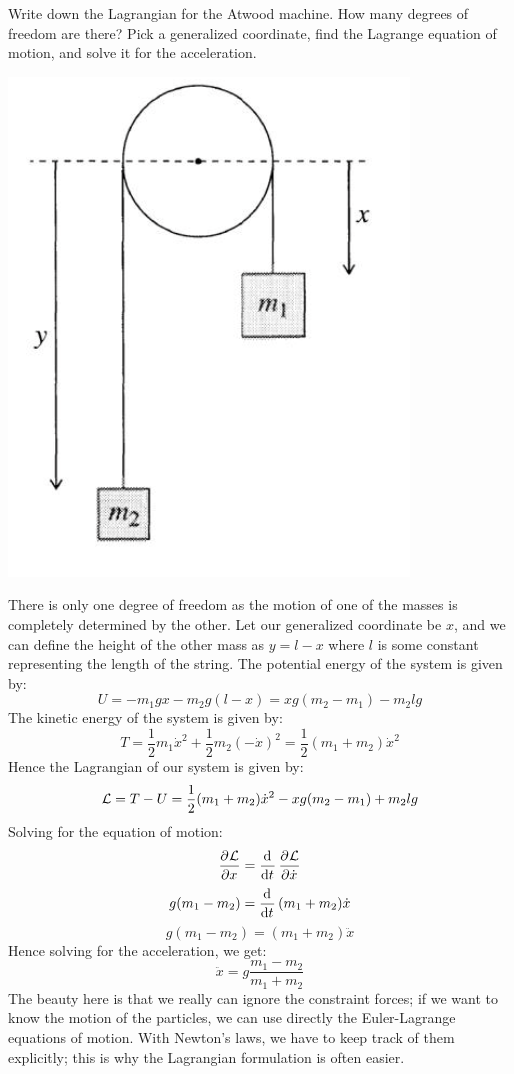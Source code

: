 \documentclass[../PHYS306Notes.tex]{subfiles}
\begin{document}
\begin{p}
Write down the Lagrangian for the Atwood machine. How many degrees of freedom are there? Pick a generalized coordinate, find the Lagrange equation of motion, and solve it for the acceleration.
\begin{center}
    \includegraphics[scale=0.6]{Lecture-4/W4-img1.png}
\end{center}
\end{p}
\begin{s}
There is only one degree of freedom as the motion of one of the masses is completely determined by the other. Let our generalized coordinate be $x$, and we can define the height of the other mass as $y = l - x$ where $l$ is some constant representing the length of the string. The potential energy of the system is given by:
\[U = -m_1gx - m_2g(l-x) = xg(m_2-m_1) - m_2lg\]
The kinetic energy of the system is given by:
\[T = \frac{1}{2}m_1\dot{x}^2 + \frac{1}{2}m_2(-\dot{x})^2 = \frac{1}{2}(m_1 + m_2)\dot{x}^2\]
Hence the Lagrangian of our system is given by:
\[\mathcal{L} = T - U = \frac{1}{2}(m_1 + m_2)\dot{x}^2 - xg(m_2-m_1) + m_2lg\]
Solving for the equation of motion:
\[\dpd{\LL}{x} = \dod{}{t}\dpd{\LL}{\dot{x}}\]
\[g(m_1 - m_2) = \dod{}{t}(m_1 + m_2)\dot{x}\]
\[g(m_1 - m_2) = (m_1 + m_2)\ddot{x}\]
Hence solving for the acceleration, we get:
\[\ddot{x} = g\frac{m_1 - m_2}{m_1 + m_2}\]
The beauty here is that we really can ignore the constraint forces; if we want to know the motion of the particles, we can use directly the Euler-Lagrange equations of motion. With Newton's laws, we have to keep track of them explicitly; this is why the Lagrangian formulation is often easier.
\end{s}
\end{document}
